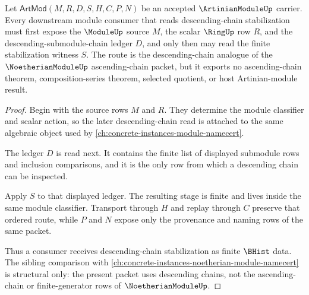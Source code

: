 \begin{theorem}\label{thm:artinian-module-descending-chain-route}
Let $\mathsf{ArtMod}(M,R,D,S,H,C,P,N)$ be an accepted $\ArtinianModuleUp$ carrier. Every downstream module consumer that reads descending-chain stabilization must first expose the $\ModuleUp$ source $M$, the scalar $\RingUp$ row $R$, and the descending-submodule-chain ledger $D$, and only then may read the finite stabilization witness $S$. The route is the descending-chain analogue of the $\NoetherianModuleUp$ ascending-chain packet, but it exports no ascending-chain theorem, composition-series theorem, selected quotient, or host Artinian-module result.
\end{theorem}
\begin{proof}
Begin with the source rows $M$ and $R$. They determine the module classifier and scalar action, so the later descending-chain read is attached to the same algebraic object used by \autoref{ch:concrete-instances-module-namecert}.

The ledger $D$ is read next. It contains the finite list of displayed submodule rows and inclusion comparisons, and it is the only row from which a descending chain can be inspected.

Apply $S$ to that displayed ledger. The resulting stage is finite and lives inside the same module classifier. Transport through $H$ and replay through $C$ preserve that ordered route, while $P$ and $N$ expose only the provenance and naming rows of the same packet.

Thus a consumer receives descending-chain stabilization as finite $\BHist$ data. The sibling comparison with \autoref{ch:concrete-instances-noetherian-module-namecert} is structural only: the present packet uses descending chains, not the ascending-chain or finite-generator rows of $\NoetherianModuleUp$.
\end{proof}


\begin{closurestatus}{\ArtinianModuleUp}
  \theoryclosure{\seedClosure}
  \formalstatus{\unformalizedV}
\end{closurestatus}
